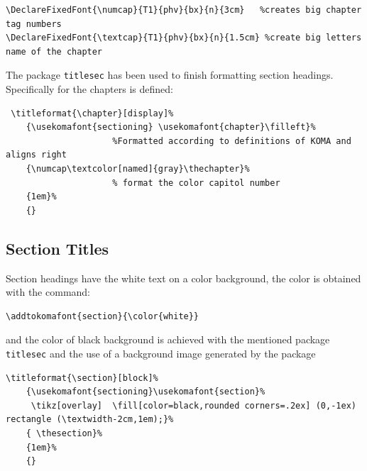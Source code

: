 \documentclass[a4paper,
                             twoside,
                             BCOR1.0cm,
                             DIV11,
                             parskip=full,
                             11pt]{scrbook}
\begin{document}
\begin{scriptsize}
\begin{verbatim}
\DeclareFixedFont{\numcap}{T1}{phv}{bx}{n}{3cm}   %creates big chapter tag numbers
\DeclareFixedFont{\textcap}{T1}{phv}{bx}{n}{1.5cm} %create big letters name of the chapter
\end{verbatim}
\end{scriptsize}
The package \verb+titlesec+ has been used to finish formatting section headings. Specifically for the chapters is defined:
\begin{scriptsize}
\begin{verbatim}
 \titleformat{\chapter}[display]%              
    {\usekomafont{sectioning} \usekomafont{chapter}\filleft}% 
                     %Formatted according to definitions of KOMA and aligns right
    {\numcap\textcolor[named]{gray}\thechapter}%                   
                     % format the color capitol number
    {1em}%
    {}
\end{verbatim}
\end{scriptsize}

\subsection{Section Titles}\label{sbsec:sectit}
Section headings have the white text on a color background, the color is obtained with the command:
\begin{scriptsize}
\begin{verbatim}
\addtokomafont{section}{\color{white}}
\end{verbatim}
\end{scriptsize}
and the color of black background is achieved with the mentioned package \verb+titlesec+ and the use of a background image generated by the package
\begin{tiny}
\begin{verbatim}
\titleformat{\section}[block]%              
    {\usekomafont{sectioning}\usekomafont{section}% 
     \tikz[overlay]  \fill[color=black,rounded corners=.2ex] (0,-1ex) rectangle (\textwidth-2cm,1em);}%  
    { \thesection}%                   
    {1em}%
    {}
\end{verbatim}
\end{tiny}
\end{document}

